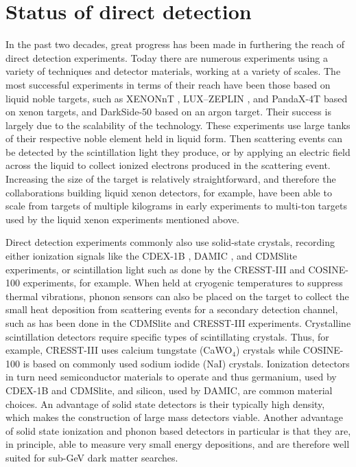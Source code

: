 \documentclass[b5paper, 10pt, twoside]{book}
\begin{document}
\section{Status of direct detection}

In the past two decades, great progress has been made in furthering the reach of direct detection experiments. Today there are numerous experiments using a variety of techniques and detector materials, working at a variety of scales. The most successful experiments in terms of their reach have been those based on liquid noble targets, such as XENONnT \parencite{XENONnT2023}, LUX--ZEPLIN \parencite{LZ2024}, and PandaX-4T \parencite{PandaX2021} based on xenon targets, and DarkSide-50 \parencite{DarkSide2023} based on an argon target. Their success is largely due to the scalability of the technology. These experiments use large tanks of their respective noble element held in liquid form. Then scattering events can be detected by the scintillation light they produce, or by applying an electric field across the liquid to collect ionized electrons produced in the scattering event. Increasing the size of the target is relatively straightforward, and therefore the collaborations building liquid xenon detectors, for example, have been able to scale from targets of multiple kilograms in early experiments to multi-ton targets used by the liquid xenon experiments mentioned above.

Direct detection experiments commonly also use solid-state crystals, recording either ionization signals like the CDEX-1B \parencite{CDEX2019}, DAMIC \parencite{DAMIC2020}, and CDMSlite \parencite{CDMSlite2018} experiments, or scintillation light such as done by the CRESST-III \parencite{CRESSTIII2019} and COSINE-100 \parencite{COSINE1002018} experiments, for example. When held at cryogenic temperatures to suppress thermal vibrations, phonon sensors can also be placed on the target to collect the small heat deposition from scattering events for a secondary detection channel, such as has been done in the CDMSlite and CRESST-III experiments. Crystalline scintillation detectors require specific types of scintillating crystals. Thus, for example, CRESST-III uses calcium tungstate (CaWO$_4$) crystals while COSINE-100 is based on commonly used sodium iodide (NaI) crystals. Ionization detectors in turn need semiconductor materials to operate and thus germanium, used by CDEX-1B and CDMSlite, and silicon, used by DAMIC, are common material choices. An advantage of solid state detectors is their typically high density, which makes the construction of large mass detectors viable. Another advantage of solid state ionization and phonon based detectors in particular is that they are, in principle, able to measure very small energy depositions, and are therefore well suited for sub-GeV dark matter searches.
\end{document}

